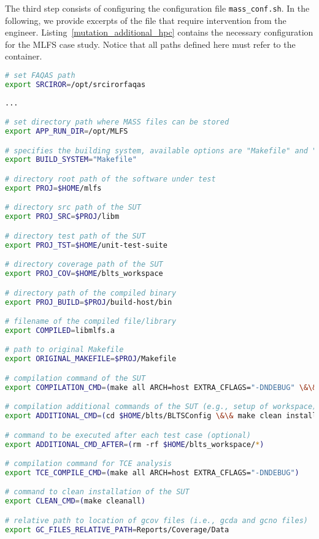 The third step consists of configuring the \MASS configuration file \texttt{mass\_conf.sh}. In the following, we provide excerpts of the file that require intervention from the engineer. Listing~\ref{mutation_additional_hpc} contains the necessary configuration for the MLFS case study.
Notice that all paths defined here must refer to the container.

\begin{lstlisting}[language=bash, label=mutation_additional_hpc ,caption=\MASS variables. Excerpt of mass\_conf.sh file.]
# set FAQAS path
export SRCIROR=/opt/srcirorfaqas
                                                     
...

# set directory path where MASS files can be stored
export APP_RUN_DIR=/opt/MLFS

# specifies the building system, available options are "Makefile" and "waf"
export BUILD_SYSTEM="Makefile"

# directory root path of the software under test
export PROJ=$HOME/mlfs

# directory src path of the SUT
export PROJ_SRC=$PROJ/libm

# directory test path of the SUT
export PROJ_TST=$HOME/unit-test-suite

# directory coverage path of the SUT
export PROJ_COV=$HOME/blts_workspace

# directory path of the compiled binary
export PROJ_BUILD=$PROJ/build-host/bin

# filename of the compiled file/library
export COMPILED=libmlfs.a

# path to original Makefile
export ORIGINAL_MAKEFILE=$PROJ/Makefile

# compilation command of the SUT
export COMPILATION_CMD=(make all ARCH=host EXTRA_CFLAGS="-DNDEBUG" \&\& make all COVERAGE="true" ARCH=host_cov EXTRA_CFLAGS="-DNDEBUG")

# compilation additional commands of the SUT (e.g., setup of workspace)
export ADDITIONAL_CMD=(cd $HOME/blts/BLTSConfig \&\& make clean install INSTALL_PATH="$HOME/blts_install" \&\& cd $HOME/blts_workspace \&\& $HOME/blts_install/bin/blts_app --init)

# command to be executed after each test case (optional)
export ADDITIONAL_CMD_AFTER=(rm -rf $HOME/blts_workspace/*)

# compilation command for TCE analysis
export TCE_COMPILE_CMD=(make all ARCH=host EXTRA_CFLAGS="-DNDEBUG")

# command to clean installation of the SUT
export CLEAN_CMD=(make cleanall)

# relative path to location of gcov files (i.e., gcda and gcno files)
export GC_FILES_RELATIVE_PATH=Reports/Coverage/Data
\end{lstlisting}


